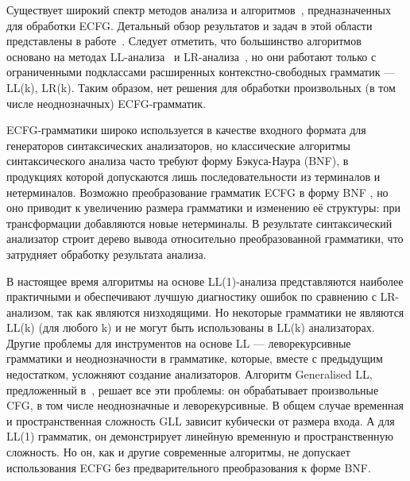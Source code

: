 Существует широкий спектр методов анализа и алгоритмов~\cite{AttributedELL,ELRR,
	ECFGparsing,ELLParser,ELL,ECFG,ELALR,ELRParsing}, предназначенных для обработки
ECFG. Детальный обзор результатов и задач в этой области представлены в работе~\cite{ECFG}.
Следует отметить, что большинство алгоритмов основано на методах
LL-анализа~\cite{ELLParser,AttributedELL,PredictiveECFG} и LR-анализа~\cite{ELRParsing,ELALR,ELRR},
но они работают только с ограниченными подклассами расширенных контекстно-свободных грамматик ---
LL(k), LR(k). Таким образом, нет решения для обработки произвольных (в том числе неоднозначных) ECFG-грамматик.

ECFG-грамматики широко используется в качестве входного формата для генераторов синтаксических анализаторов, 
но классические алгоритмы синтаксического анализа часто требуют форму Бэкуса-Наура (BNF),
в продукциях которой допускаются лишь последовательности из терминалов и нетерминалов.
Возможно преобразование грамматик ECFG в форму BNF \cite{ELL}, но оно приводит к увеличению
размера грамматики и изменению её структуры: при трансформации добавляются новые
нетерминалы. В результате синтаксический анализатор строит дерево вывода относительно
преобразованной грамматики, что затрудняет обработку результата анализа.

В настоящее время алгоритмы на основе LL(1)-анализа представляются
наиболее практичными и обеспечивают лучшую диагностику ошибок по сравнению с LR-анализом, так как являются низходящими. 
Но некоторые грамматики не являются LL(k) (для любого k) и не могут быть использованы в LL(k) анализаторах.
Другие проблемы для инструментов на основе LL --- леворекурсивные грамматики и неоднозначности в грамматике, 
которые, вместе с предыдущим недостатком, усложняют создание анализаторов. 
Алгоритм Generalised LL, предложенный в~\cite{scott2010gll}, решает 
все эти проблемы: он обрабатывает произвольные CFG, в том числе неоднозначные и леворекурсивные.
В общем случае временная и пространственная сложность GLL зависит кубически от 
размера входа. А для LL(1) грамматик, он демонстрирует линейную временную и
пространственную сложность. Но он, как и другие современные алгоритмы, не допускает использования ECFG 
без предварительного преобразования к форме BNF.

